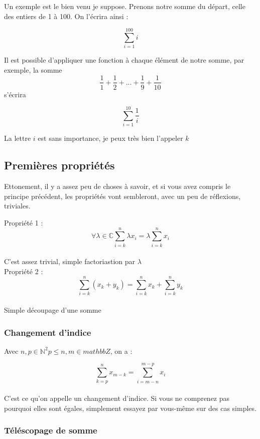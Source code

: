 \documentclass{article}
\begin{document}
Un exemple est le bien venu je suppose. Prenons notre somme du départ, celle des entiers de 1 à 100. On l'écrira ainsi :
\begin{center}
  \[\sum_{i=1}^{100} i\]
\end{center}

Il est possible d'appliquer une fonction à chaque élément de notre somme, par exemple, la somme \[\frac{1}{1} + \frac{1}{2} + ... +\frac{1}{9} + \frac{1}{10} \] s'écrira

\begin{center}
  \[\sum_{i=1}^{10} \frac{1}{i}\]
\end{center}
La lettre $i$ est sans importance, je peux très bien l'appeler $k$

\subsection{Premières propriétés}


Ettonement, il y a assez peu de choses à savoir, et si vous avez compris le principe précédent, les propriétés vont sembleront, avec un peu de réflexions, triviales.

Propriété 1 : \[\forall \lambda \in \mathbb{C} \sum_{i=k}^{n}\lambda x_{i} = \lambda \sum_{i=k}^{n}x_{i}\]\\
C'est assez trivial, simple factoriastion par $\lambda$\\
Propriété 2 : \[\sum_{i=k}^{n}(x_{k}+y_{k}) = \sum_{i=k}^{n}x_{k} +  \sum_{i=k}^{n}y_{k}\]\\
Simple découpage d'une somme

\subsubsection{Changement d'indice}

Avec $n, p \in \mathbb{N}^{2} p \le n, m \in mathbb{Z}$, on a :

\[\sum_{k=p}^{n} x_{m-k} = \sum_{i=m-n}^{m-p} x_{i}\]\\

C'est ce qu'on appelle un changement d'indice. Si vous ne comprenez pas pourquoi elles sont égales, simplement essayez par vous-même sur des cas simples.

\subsubsection{Téléscopage de somme}
\end{document}
